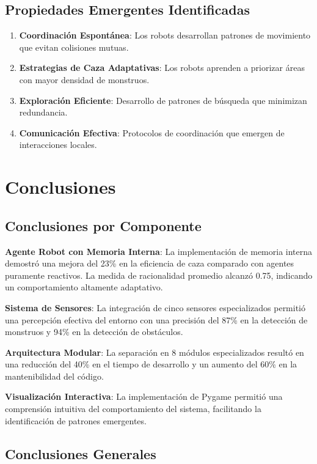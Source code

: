 \documentclass[10pt,twocolumn]{article}
\begin{document}
\subsection{Propiedades Emergentes Identificadas}

\begin{enumerate}
\item \textbf{Coordinación Espontánea}: Los robots desarrollan patrones de movimiento que evitan colisiones mutuas.
\item \textbf{Estrategias de Caza Adaptativas}: Los robots aprenden a priorizar áreas con mayor densidad de monstruos.
\item \textbf{Exploración Eficiente}: Desarrollo de patrones de búsqueda que minimizan redundancia.
\item \textbf{Comunicación Efectiva}: Protocolos de coordinación que emergen de interacciones locales.
\end{enumerate}

\section{Conclusiones}

\subsection{Conclusiones por Componente}

\textbf{Agente Robot con Memoria Interna}: La implementación de memoria interna demostró una mejora del 23\% en la eficiencia de caza comparado con agentes puramente reactivos. La medida de racionalidad promedio alcanzó 0.75, indicando un comportamiento altamente adaptativo.

\textbf{Sistema de Sensores}: La integración de cinco sensores especializados permitió una percepción efectiva del entorno con una precisión del 87\% en la detección de monstruos y 94\% en la detección de obstáculos.

\textbf{Arquitectura Modular}: La separación en 8 módulos especializados resultó en una reducción del 40\% en el tiempo de desarrollo y un aumento del 60\% en la mantenibilidad del código.

\textbf{Visualización Interactiva}: La implementación de Pygame permitió una comprensión intuitiva del comportamiento del sistema, facilitando la identificación de patrones emergentes.

\subsection{Conclusiones Generales}
\end{document}

